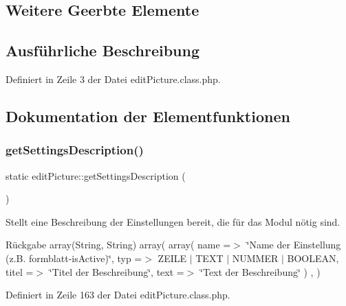 \subsection*{Weitere Geerbte Elemente}


\subsection{Ausführliche Beschreibung}


Definiert in Zeile 3 der Datei edit\+Picture.\+class.\+php.



\subsection{Dokumentation der Elementfunktionen}
\mbox{\label{classedit_picture_ad4465be4b4b6c81d258f64c9ab3c67e2}} 
\subsubsection{\texorpdfstring{get\+Settings\+Description()}{getSettingsDescription()}}
{\footnotesize\ttfamily static edit\+Picture\+::get\+Settings\+Description (\begin{DoxyParamCaption}{ }\end{DoxyParamCaption})\hspace{0.3cm}{\ttfamily [static]}}

Stellt eine Beschreibung der Einstellungen bereit, die für das Modul nötig sind. \begin{DoxyReturn}{Rückgabe}
array(\+String, String) array( array( \textquotesingle{}name\textquotesingle{} =$>$ \char`\"{}\+Name der Einstellung (z.\+B. formblatt-\/is\+Active)\char`\"{}, \textquotesingle{}typ\textquotesingle{} =$>$ Z\+E\+I\+LE $\vert$ T\+E\+XT $\vert$ N\+U\+M\+M\+ER $\vert$ B\+O\+O\+L\+E\+AN, \textquotesingle{}titel\textquotesingle{} =$>$ \char`\"{}\+Titel der Beschreibung\char`\"{}, \textquotesingle{}text\textquotesingle{} =$>$ \char`\"{}\+Text der Beschreibung\char`\"{} ) , ) 
\end{DoxyReturn}


Definiert in Zeile 163 der Datei edit\+Picture.\+class.\+php.

\mbox{\label{classedit_picture_a669cb68358763fad84048cb316df96c9}} 
